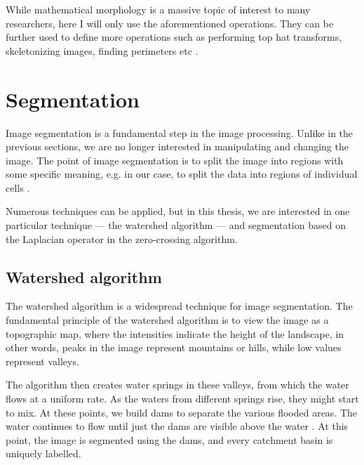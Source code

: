 \documentclass[
  digital,     %
  oneside,     %
  nosansbold,  %
  nocolorbold, %
  lof,         %
  lot,         %
]{fithesis4}
\begin{document}
While mathematical morphology is a massive topic of interest to many
researchers, here I will only use the aforementioned operations. They can be
further used to define more operations such as performing top hat transforms,
skeletonizing images, finding perimeters etc \cite{mathworks_morp_oper}.

\section{Segmentation}

Image segmentation is a fundamental step in the image processing. Unlike in the
previous sections, we are no longer interested in manipulating and changing the
image. The point of image segmentation is to split the image into regions with
some specific meaning, e.g. in our case, to split the data into regions of
individual cells \cite{gonzalez2002}.

Numerous techniques can be applied, but in this thesis, we are interested in
one particular technique --- the watershed algorithm --- and segmentation based
on the Laplacian operator in the zero-crossing algorithm.

\subsection{Watershed algorithm}

The watershed algorithm is a widespread technique for image segmentation. The
fundamental principle of the watershed algorithm is to view the image as a
topographic map, where the intensities indicate the height of the landscape, in
other words, peaks in the image represent mountains or hills, while low values
represent valleys.

The algorithm then creates water springs in these valleys, from which the water
flows at a uniform rate. As the waters from different springs rise, they might
start to mix. At these points, we build dams to separate the various flooded
areas. The water continues to flow until just the dams are visible above the
water \cite{gonzalez2002}. At this point, the image is segmented using the dams,
and every catchment basin is uniquely labelled.
\end{document}

